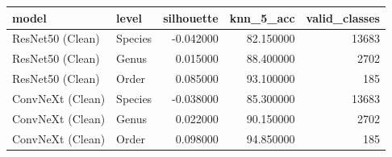 \begin{tabular}{llrrr}
\toprule
model & level & silhouette & knn_5_acc & valid_classes \\
\midrule
ResNet50 (Clean) & Species & -0.042000 & 82.150000 & 13683 \\
ResNet50 (Clean) & Genus & 0.015000 & 88.400000 & 2702 \\
ResNet50 (Clean) & Order & 0.085000 & 93.100000 & 185 \\
ConvNeXt (Clean) & Species & -0.038000 & 85.300000 & 13683 \\
ConvNeXt (Clean) & Genus & 0.022000 & 90.150000 & 2702 \\
ConvNeXt (Clean) & Order & 0.098000 & 94.850000 & 185 \\
\bottomrule
\end{tabular}
